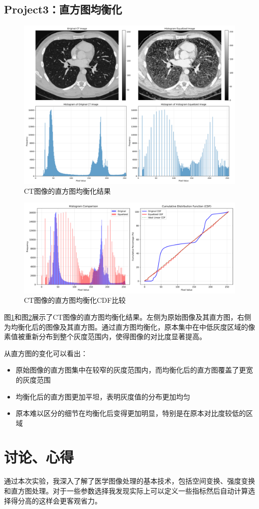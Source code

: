 \documentclass[10.5pt]{config}
\begin{document}
\subsection{Project3：直方图均衡化}
\begin{figure}[htbp]
    \centering
    \includegraphics[width=1.0\linewidth]{figures/ct_histogram_equalization.png}
    \caption{CT图像的直方图均衡化结果}
    \label{fig:histogram_eq}
\end{figure}
\begin{figure}[htbp]
    \centering
    \includegraphics[width=1.0\linewidth]{figures/ct_histogram_cdf_comparison.png}
    \caption{CT图像的直方图均衡化CDF比较}
    \label{fig:histogram_cdf}
\end{figure}
图\ref{fig:histogram_eq}和图\ref{fig:histogram_cdf}展示了CT图像的直方图均衡化结果。左侧为原始图像及其直方图，右侧为均衡化后的图像及其直方图。通过直方图均衡化，原本集中在中低灰度区域的像素值被重新分布到整个灰度范围内，使得图像的对比度显著提高。

从直方图的变化可以看出：
\begin{itemize}
    \item 原始图像的直方图集中在较窄的灰度范围内，而均衡化后的直方图覆盖了更宽的灰度范围
    \item 均衡化后的直方图更加平坦，表明灰度值的分布更加均匀
    \item 原本难以区分的细节在均衡化后变得更加明显，特别是在原本对比度较低的区域
\end{itemize}
\clearpage
\section{讨论、心得}
通过本次实验，我深入了解了医学图像处理的基本技术，包括空间变换、强度变换和直方图处理。对于一些参数选择我发现实际上可以定义一些指标然后自动计算选择得分高的这样会更客观省力。
\end{document}
